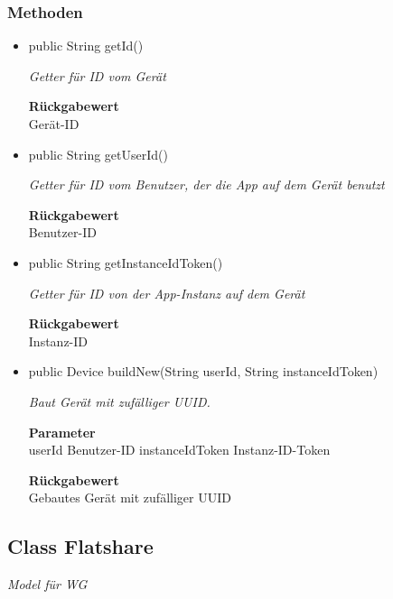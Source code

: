 \documentclass[a4paper]{scrreprt}
\begin{document}
    \subsubsection{Methoden}
    \begin{itemize}
    	\item{public String getId()}
    	
    	\textit{Getter für ID vom Gerät}
    	
    	
    	
    	\textbf{Rückgabewert} \\
    	Gerät-ID        \item{public String getUserId()}
    	
    	\textit{Getter für ID vom Benutzer, der die App auf dem Gerät benutzt}
    	
    	
    	
    	\textbf{Rückgabewert} \\
    	Benutzer-ID        \item{public String getInstanceIdToken()}
    	
    	\textit{Getter für ID von der App-Instanz auf dem Gerät}
    	
    	
    	
    	\textbf{Rückgabewert} \\
    	Instanz-ID        \item{public Device buildNew(String userId, String instanceIdToken)}
    	
    	\textit{Baut Gerät mit zufälliger UUID.}
    	
    	\textbf{Parameter} \\
    	userId Benutzer-ID
    	instanceIdToken Instanz-ID-Token
    	
    	\textbf{Rückgabewert} \\
    	Gebautes Gerät mit zufälliger UUID
    \end{itemize}
    \subsection{Class Flatshare}
    \textit{Model für WG}
\end{document}
